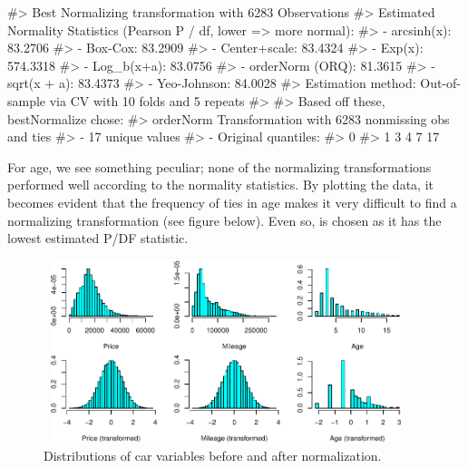\begin{Schunk}

\begin{Soutput}
#> Best Normalizing transformation with 6283 Observations
#>  Estimated Normality Statistics (Pearson P / df, lower => more normal):
#>  - arcsinh(x): 83.2706
#>  - Box-Cox: 83.2909
#>  - Center+scale: 83.4324
#>  - Exp(x): 574.3318
#>  - Log_b(x+a): 83.0756
#>  - orderNorm (ORQ): 81.3615
#>  - sqrt(x + a): 83.4373
#>  - Yeo-Johnson: 84.0028
#> Estimation method: Out-of-sample via CV with 10 folds and 5 repeats
#>  
#> Based off these, bestNormalize chose:
#> orderNorm Transformation with 6283 nonmissing obs and ties
#>  - 17 unique values 
#>  - Original quantiles:
#>   0%
#>    1    3    4    7   17
\end{Soutput}
\end{Schunk}

For age, we see something peculiar; none of the normalizing
transformations performed well according to the normality statistics. By
plotting the data, it becomes evident that the frequency of ties in age
makes it very difficult to find a normalizing transformation (see figure
below). Even so,  is chosen as it has the lowest
estimated P/DF statistic.

\begin{Schunk}
\begin{figure}

{\centering \includegraphics[width=4.2in,height=2.1in]{figs/hist_app-1} 

}

\caption[Distributions of car variables before and after normalization]{Distributions of car variables before and after normalization.}\label{fig:hist_app}
\end{figure}
\end{Schunk}

